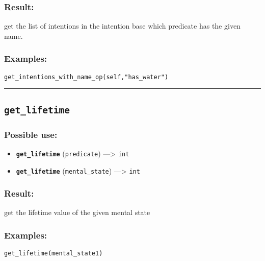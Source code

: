 \documentclass[]{book}
\providecommand{\tightlist}{%
  \setlength{\itemsep}{0pt}\setlength{\parskip}{0pt}}
\theoremstyle{definition}
\theoremstyle{definition}
\theoremstyle{definition}
\theoremstyle{remark}
\begin{document}
\subsubsection{Result:}\label{result-211}

get the list of intentions in the intention base which predicate has the
given name.

\subsubsection{Examples:}\label{examples-164}

\begin{verbatim}
get_intentions_with_name_op(self,"has_water") 
\end{verbatim}

\begin{center}\rule{0.5\linewidth}{\linethickness}\end{center}

\subsection{\texorpdfstring{\texttt{get\_lifetime}}{get\_lifetime}}\label{get_lifetime}

\subsubsection{Possible use:}\label{possible-use-218}

\begin{itemize}
\tightlist
\item
  \textbf{\texttt{get\_lifetime}} (\texttt{predicate}) ---\textgreater{}
  \texttt{int}
\item
  \textbf{\texttt{get\_lifetime}} (\texttt{mental\_state})
  ---\textgreater{} \texttt{int}
\end{itemize}

\subsubsection{Result:}\label{result-212}

get the lifetime value of the given mental state

\subsubsection{Examples:}\label{examples-165}

\begin{verbatim}
get_lifetime(mental_state1) 
\end{verbatim}
\end{document}
